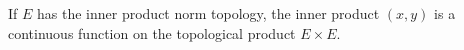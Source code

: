 If $E$ has the inner product norm topology, the inner product $(x,y)$ is a continuous function on the topological product $E \times E$.
